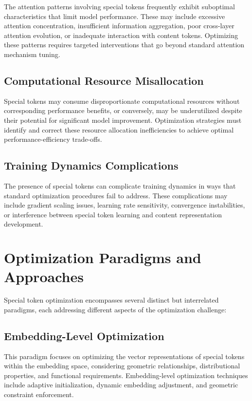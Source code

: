 The attention patterns involving special tokens frequently exhibit suboptimal characteristics that limit model performance. These may include excessive attention concentration, insufficient information aggregation, poor cross-layer attention evolution, or inadequate interaction with content tokens. Optimizing these patterns requires targeted interventions that go beyond standard attention mechanism tuning.

\subsection{Computational Resource Misallocation}

Special tokens may consume disproportionate computational resources without corresponding performance benefits, or conversely, may be underutilized despite their potential for significant model improvement. Optimization strategies must identify and correct these resource allocation inefficiencies to achieve optimal performance-efficiency trade-offs.

\subsection{Training Dynamics Complications}

The presence of special tokens can complicate training dynamics in ways that standard optimization procedures fail to address. These complications may include gradient scaling issues, learning rate sensitivity, convergence instabilities, or interference between special token learning and content representation development.

\section{Optimization Paradigms and Approaches}

Special token optimization encompasses several distinct but interrelated paradigms, each addressing different aspects of the optimization challenge:

\subsection{Embedding-Level Optimization}

This paradigm focuses on optimizing the vector representations of special tokens within the embedding space, considering geometric relationships, distributional properties, and functional requirements. Embedding-level optimization techniques include adaptive initialization, dynamic embedding adjustment, and geometric constraint enforcement.

